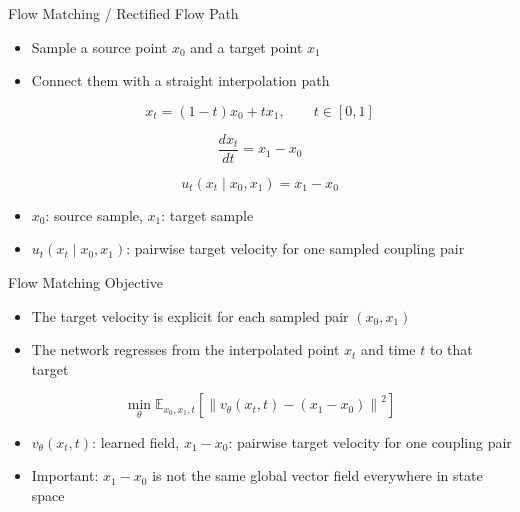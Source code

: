 \documentclass[10pt,aspectratio=169]{ntuabeamer}
\begin{document}
\begin{frame}{Flow Matching / Rectified Flow Path}
  \begin{itemize}
    \item Sample a source point \(x_0\) and a target point \(x_1\)
    \item Connect them with a straight interpolation path
  \end{itemize}

  \[
    x_t = (1-t)x_0 + t x_1,
    \qquad t \in [0,1]
  \]

  \[
    \frac{d x_t}{dt} = x_1 - x_0
  \]

  \[
    u_t(x_t \mid x_0, x_1) = x_1 - x_0
  \]

  \begin{itemize}
    \item \(x_0\): source sample, \(x_1\): target sample
    \item \(u_t(x_t \mid x_0, x_1)\): pairwise target velocity for one sampled coupling pair
  \end{itemize}
\end{frame}

\begin{frame}{Flow Matching Objective}
  \small
  \begin{itemize}
    \item The target velocity is explicit for each sampled pair \((x_0, x_1)\)
    \item The network regresses from the interpolated point \(x_t\) and time \(t\) to that target
  \end{itemize}

  \[
    \min_\theta
    \mathbb E_{x_0,x_1,t}
    \left[
      \left\|
        v_\theta(x_t,t) - (x_1-x_0)
      \right\|^2
    \right]
  \]

  \begin{itemize}
    \item \(v_\theta(x_t,t)\): learned field, \(x_1-x_0\): pairwise target velocity for one coupling pair
    \item Important: \(x_1-x_0\) is not the same global vector field everywhere in state space
  \end{itemize}
\end{frame}
\end{document}
